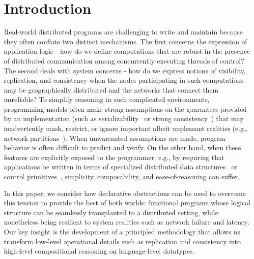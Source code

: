 \section{Introduction}
\label{sec:intro}

Real-world distributed programs are challenging to write and maintain
because they often conflate two distinct mechanisms.  The first
concerns the expression of application logic - how do we define
computations that are robust in the presence of distributed
communication among concurrently executing threads of control?  The
second deals with system concerns - how do we express notions of
visibility, replication, and consistency when the nodes participating
in such computations may be geographically distributed and the
networks that connect them unreliable?  To simplify reasoning in such
complicated environments, programming models often make strong
assumptions on the guarantees provided by an implementation (such as
serializability~\cite{Serializability} or strong
consistency~\cite{CDE+12,DNN+15}) that may inadvertently mask,
restrict, or ignore important albeit unpleasant realities (e.g.,
network partitions~\cite{Brewer2000,Gilbert2002}). When unwarranted
assumptions are made, program behavior is often difficult to predict
and verify.  On the other hand, when these features are explicitly
exposed to the programmer, e.g., by requiring that applications be
written in terms of specialized distributed data
structures~\cite{Burckhardt2014,BFL+12,SPB+11} or control
primitives~\cite{Calm}, simplicity, composability, and
ease-of-reasoning can suffer.

In this paper, we consider how declarative abstractions can be used to
overcome this tension to provide the best of both worlds: functional
programs whose logical structure can be seamlessly transplanted to a
distributed setting, while nonetheless being resilient to system
realities such as network failure and latency.  Our key insight is the
development of a principled methodology that allows us transform
low-level operational details such as replication and consistency
into high-level compositional reasoning on language-level datatypes.

